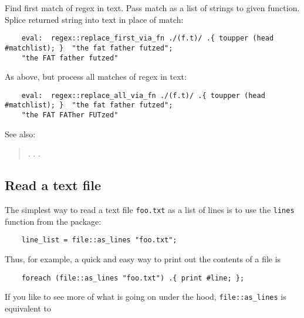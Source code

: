 Find first match of regex in text. 
Pass match as a list of strings to given function. 
Splice returned string into text in place of match:
\begin{verbatim}
    eval:  regex::replace_first_via_fn ./(f.t)/ .{ toupper (head #matchlist); }  "the fat father futzed";
    "the FAT father futzed"
\end{verbatim}

As above, but process all matches of regex in text:
\begin{verbatim}
    eval:  regex::replace_all_via_fn ./(f.t)/ .{ toupper (head #matchlist); }  "the fat father futzed";
    "the FAT FATher FUTzed"
\end{verbatim}

See also:
\begin{quotation}
.\newline 
{}.\newline 
{}.\newline
{}\newline
\end{quotation}
\cutend*


\subsection{Read a text file}

The simplest way to read a text file {\tt foo.txt} as a list of lines is 
to use the {\tt lines} function from the 
 package:

\begin{verbatim}
    line_list = file::as_lines "foo.txt";
\end{verbatim}

Thus, for example, a quick and easy way to print out the contents of a file is

\begin{verbatim}
    foreach (file::as_lines "foo.txt") .{ print #line; };
\end{verbatim}

If you like to see more of what is going on under the hood, {\tt file::as\_lines} 
is equivalent to

